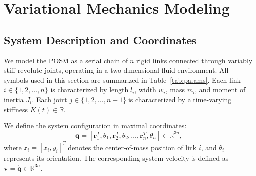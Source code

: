\section{Variational Mechanics Modeling}
\label{sec:POSM_modeling}

\subsection{System Description and Coordinates}

We model the POSM as a serial chain of $n$ rigid links connected through variably stiff revolute joints, operating in a two-dimensional fluid environment. All symbols used in this section are summarized in Table~\ref{tab:params}. Each link $i \in \{1, 2, \ldots, n\}$ is characterized by length $l_i$, width $w_i$, mass $m_i$, and moment of inertia $J_i$. Each joint $j \in \{1, 2, \ldots, n-1\}$ is characterized by a time-varying stiffness $K(t) \in \mathbb{R}$.

We define the system configuration in maximal coordinates:
\begin{equation}
\mathbf{q} = [\mathbf{r}_1^T, \theta_1, \mathbf{r}_2^T, \theta_2, \ldots, \mathbf{r}_n^T, \theta_n] \in \mathbb{R}^{3n},
\end{equation}
where $\mathbf{r}_i = [x_i, y_i]^T$ denotes the center-of-mass position of link $i$, and $\theta_i$ represents its orientation. The corresponding system velocity is defined as $\mathbf{v} = \dot{\mathbf{q}} \in \mathbb{R}^{3n}$.

